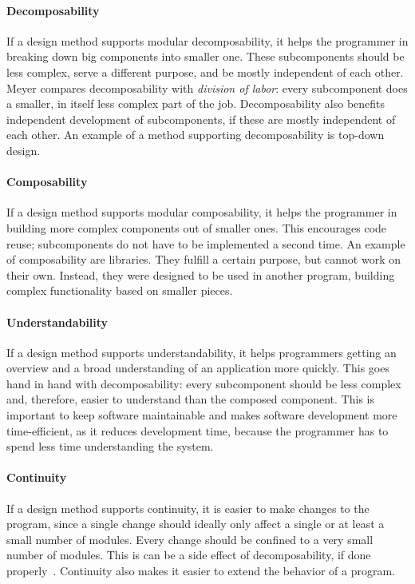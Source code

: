 \paragraph{Decomposability}
If a design method supports modular decomposability, it helps the programmer in breaking down big components into smaller one. These subcomponents should be less complex, serve a different purpose, and be mostly independent of each other. Meyer compares decomposability with \emph{division of labor}: every subcomponent does a smaller, in itself less complex part of the job. Decomposability also benefits independent development of subcomponents, if these are mostly independent of each other. An example of a method supporting decomposability is top-down design.

\paragraph{Composability}
If a design method supports modular composability, it helps the programmer in building more complex components out of smaller ones. This encourages code reuse; subcomponents do not have to be implemented a second time. An example of composability are libraries. They fulfill a certain purpose, but cannot work on their own. Instead, they were designed to be used in another program, building complex functionality based on smaller pieces.

\paragraph{Understandability}
If a design method supports understandability, it helps programmers getting an overview and a broad understanding of an application more quickly. This goes hand in hand with decomposability: every subcomponent should be less complex and, therefore, easier to understand than the composed component. This is important to keep software maintainable and makes software development more time-efficient, as it reduces development time, because the programmer has to spend less time understanding the system.

\paragraph{Continuity}
If a design method supports continuity, it is easier to make changes to the program, since a single change should ideally only affect a single or at least a small number of modules. Every change should be confined to a very small number of modules. This is can be a side effect of decomposability, if done properly~\cite{Parnas:1972:CUD:361598.361623}. Continuity also makes it easier to extend the behavior of a program.


